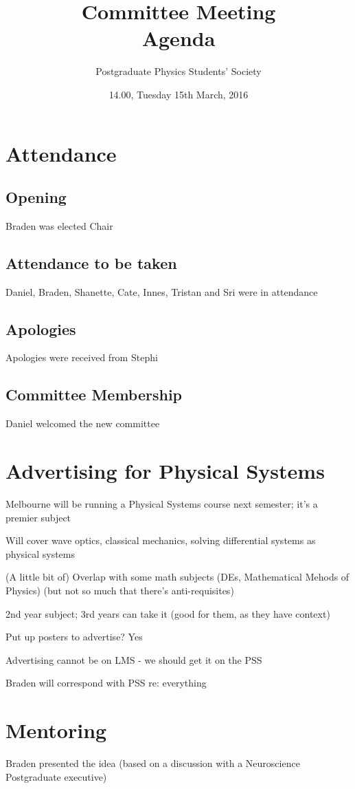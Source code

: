 \documentclass[a4paper,11pt]{article}
\title{Committee Meeting\\Agenda}
\author{Postgraduate Physics Students' Society}
\date{14.00, Tuesday 15th March, 2016}
\begin{document}
\thispagestyle{empty}\pagestyle{empty}
\maketitle
\section{Attendance}
\subsection{Opening}
Braden was elected Chair
\subsection{Attendance to be taken}
Daniel, Braden, Shanette, Cate, Innes, Tristan and Sri were in attendance
\subsection{Apologies}
Apologies were received from Stephi
\subsection{Committee Membership}
Daniel welcomed the new committee

\section{Advertising for Physical Systems}
Melbourne will be running a Physical Systems course next semester; it's a premier subject

Will cover wave optics, classical mechanics, solving differential systems as physical systems

(A little bit of) Overlap with some math subjects (DEs, Mathematical Mehods of Physics) (but not so much that there's anti-requisites)

2nd year subject; 3rd years can take it (good for them, as they have context)

Put up posters to advertise? Yes

Advertising cannot be on LMS - we should get it on the PSS

Braden will correspond with PSS re: everything


\section{Mentoring}
Braden presented the idea (based on a discussion with a Neuroscience Postgraduate executive)
\end{document}
